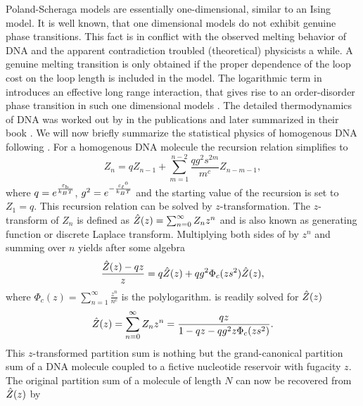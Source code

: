 Poland-Scheraga models are essentially one-dimensional, similar to an Ising model.
It is well known, that one dimensional models do not exhibit 
genuine phase transitions. This fact is in conflict with the observed melting behavior of DNA and the 
apparent contradiction troubled (theoretical) physicists a while.
A genuine melting transition is only obtained if the proper dependence of
the loop cost on the loop length is included in the model.
The logarithmic term in  introduces an effective long range interaction, that gives rise to  
an order-disorder phase transition in such one dimensional models \cite{Fisher_JChemPhys_66}.
The detailed thermodynamics of DNA was worked out by \citeauthor{Poland_JChemPhys_66a}
in the publications \cite{Poland_JChemPhys_66a,Poland_JChemPhys_66b} and later 
summarized in their book \cite{Poland_Scheraga_70}. We will now briefly summarize
the statistical physics of homogenous DNA following  \citeauthor{Poland_JChemPhys_66a}.
For a homogenous DNA molecule the recursion relation  simplifies to
\begin{equation}
\label{eq:PS_partsum}
Z_{n} = q Z_{n-1}+\sum_{m=1}^{n-2}\frac{qg^{2}s^{2m}}{m^{c}} Z_{n-m-1},
\end{equation}
where $q=e^{\frac{{\varepsilon_{\rm b}}}{k_BT}}$, $g^{2}=e^{-\frac{{\varepsilon_{\ell}}^{0}}{k_BT}}$ and the starting value of the recursion is 
set to $Z_1=q$. This recursion relation can be solved by $z$-transformation. The $z$-transform of
$Z_n$ is defined as $\hat{Z}(z)=\sum_{n=0}^{\infty} Z_n z^{n}$ and is also known as generating function 
or discrete Laplace transform. Multiplying both sides of  by $z^{n}$ and summing 
over $n$ yields after some algebra
\begin{equation}
\label{eq:PS_z_transform}
\frac{\hat{Z}(z)-qz}{z} = q\hat{Z}(z)+qg^{2}\Phi_c(zs^{2})\hat{Z}(z),
\end{equation}
where $\Phi_c(z)=\sum_{n=1}^{\infty}\frac{z^{n}}{n^{c}}$ is the polylogarithm.  
is readily solved for $\hat{Z}(z)$
\begin{equation}
\label{eq:PS_Zh}
\hat{Z}(z) = \sum_{n=0}^{\infty} Z_n z^{n}=\frac{qz}{1-qz-qg^{2}z\Phi_c(zs^{2})}.
\end{equation}
This $z$-transformed partition sum is nothing but the grand-canonical partition sum of a DNA
molecule coupled to a fictive nucleotide reservoir with fugacity $z$. 
The original partition sum of a molecule of length $N$ can now be recovered from $\hat{Z}(z)$ by 
